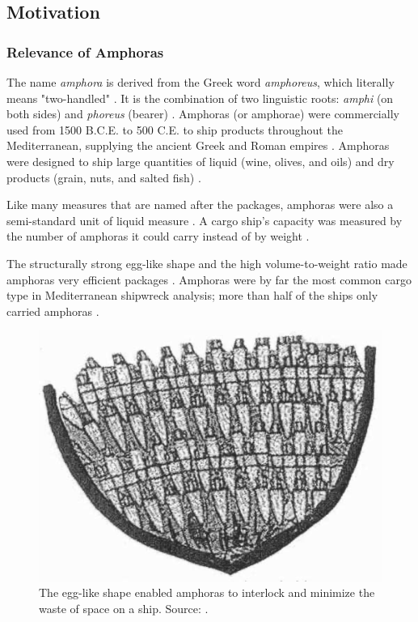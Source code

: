 \documentclass[a4paper,11pt,oneside]{article}
\begin{document}

  \subsection{Motivation}

  \subsubsection{Relevance of Amphoras}

  The name \textit{amphora} is derived from the Greek word \textit{amphoreus}, which literally means "two-handled"
  \cite{harper2001online, twede2002commercial}. It is the combination of two linguistic roots: \textit{amphi}
  (on both sides) and \textit{phoreus} (bearer) \cite{harper2001online, twede2002commercial}. Amphoras (or amphorae)
  were commercially used from 1500 B.C.E. to 500 C.E. to ship products throughout the Mediterranean,
  supplying the ancient Greek and Roman empires \cite{twede2002commercial}. Amphoras were designed to ship large quantities
  of liquid (wine, olives, and oils) and dry products (grain, nuts, and salted fish) \cite{twede2002commercial}.

  Like many measures that are named after the packages, amphoras were also a semi-standard unit of liquid
  measure \cite{twede2002commercial}. A cargo ship's capacity was measured by the number of amphoras it could carry
  instead of by weight \cite{twede2002commercial, cousteau1954fish}.

  The structurally strong egg-like shape and the high volume-to-weight ratio made amphoras very efficient packages
  \cite{twede2002commercial}. Amphoras were by far the most common cargo type in Mediterranean shipwreck analysis;
  more than half of the ships only carried amphoras \cite{twede2002commercial, parker1984shipwrecks}.

  \begin{figure}[ht]
    \begin{center}
      \includegraphics[width=.8\textwidth]{amphora_stowage_aboard_ship.png}
    \end{center}
    \caption{The egg-like shape enabled amphoras to interlock and minimize the waste of space on a ship.
    Source: \cite{twede2002commercial}.}
  \end{figure}
\end{document}

